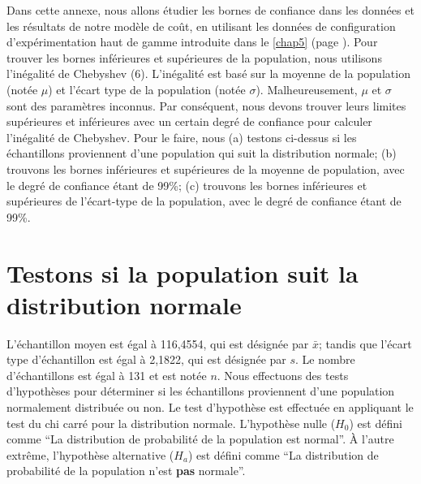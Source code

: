 \label{annex:ConfidenceBounds}
Dans cette annexe, nous allons étudier les bornes de confiance dans les données et les résultats de notre modèle de coût, en utilisant les données de configuration d'expérimentation haut de gamme introduite dans le \ref{chap5} (page \pageref{chap5}). Pour trouver les bornes inférieures et supérieures de la population, nous utilisons l'inégalité de Chebyshev (6). L'inégalité est basé sur la moyenne de la population (notée $\mu$) et l'écart type de la population (notée $\sigma$). Malheureusement, $\mu$ et $\sigma$ sont des paramètres inconnus. Par conséquent, nous devons trouver leurs limites supérieures et inférieures avec un certain degré de confiance pour calculer l'inégalité de Chebyshev. Pour le faire, nous (a) testons ci-dessus si les échantillons proviennent d'une population qui suit la distribution normale; (b) trouvons les bornes inférieures et supérieures de la moyenne de population, avec le degré de confiance étant de 99\%; (c) trouvons les bornes inférieures et supérieures de l'écart-type de la population, avec le degré de confiance étant de 99\%.

\section{Testons si la population suit la distribution normale}
L'échantillon moyen est égal à 116,4554, qui est désignée par $\bar{x}$; tandis que l'écart type d'échantillon est égal à 2,1822, qui est désignée par $s$. Le nombre d'échantillons est égal à 131 et est notée $n$.
Nous effectuons des tests d'hypothèses pour déterminer si les échantillons proviennent d'une population normalement distribuée ou non. Le test d'hypothèse est effectuée en appliquant le test du chi carré pour la distribution normale.
L'hypothèse nulle ($H_0$) est défini comme ``La distribution de probabilité de la population est normal''. À l'autre extrême, l'hypothèse alternative ($H_a$) est défini comme ``La distribution de probabilité de la population n'est \textbf {pas} normale''.

